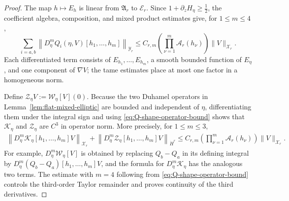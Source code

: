 \documentclass[12pt]{amsart}
\theoremstyle{remark}
\theoremstyle{definition}
\numberwithin{equation}{section}
\begin{document}
\begin{proof}
The map \(h\mapsto E_h\) is linear from \(\mathfrak A_r\) to \(\mathcal E_r\).  
Since \(1+\partial_zH_\eta\geq\frac12\), the coefficient algebra, composition, and mixed product estimates give, for
\(1\leq m\leq4\),
\begin{equation}
\label{eq:Q-shape-operator-bound}
 \sum_{i = a, b}\left\| D_\eta^mQ_i(\eta,V) [h_1,\ldots,h_m] \right\|_{\mathcal Y_r}\leq C_{r,m} \left( \prod_{\nu=1}^m \mathcal A_r(h_\nu) \right) \|V\|_{\mathcal X_r}.
\end{equation}
Each differentiated term consists of \(E_{h_1},\ldots,E_{h_m}\), a smooth bounded function of \(E_\eta\), and one component of \(\nabla V\);
the tame estimates place at most one factor in a homogeneous norm.

Define \(\mathcal Z_\eta V:=\mathcal W_\eta[V](0)\).
Because the two Duhamel operators in Lemma~\ref{lem:flat-mixed-elliptic} are bounded and independent of \(\eta\), differentiating them under the integral sign and using
\eqref{eq:Q-shape-operator-bound} shows that \(\mathcal K_\eta\) and \(\mathcal Z_\eta\) are \(C^3\) in operator norm.  
More precisely, for
\(1\leq m\leq3\),
\begin{equation}
\label{eq:K-shape-bound}
\begin{aligned}
 \left\| D_\eta^m\mathcal K_\eta [h_1,\ldots,h_m]V \right\|_{\mathcal X_r}+ \left\| D_\eta^m\mathcal Z_\eta [h_1,\ldots,h_m]V \right\|_{\dot H^r}\leq C_{r,m} \left( \prod_{\nu=1}^m \mathcal A_r(h_\nu) \right) \|V\|_{\mathcal X_r}.
\end{aligned}
\end{equation}
For example, \(D_\eta^m\mathcal W_\eta[V]\) is obtained by replacing \(Q_b-Q_a\) in its defining integral by \(D_\eta^m(Q_b-Q_a)[h_1,\ldots,h_m]V\), and the formula for
\(D_\eta^m\mathcal K_\eta\) has the analogous two terms.  
The estimate with \(m=4\) following from \eqref{eq:Q-shape-operator-bound} controls the third-order Taylor remainder and proves continuity of the third derivatives.


\end{proof}
\end{document}
